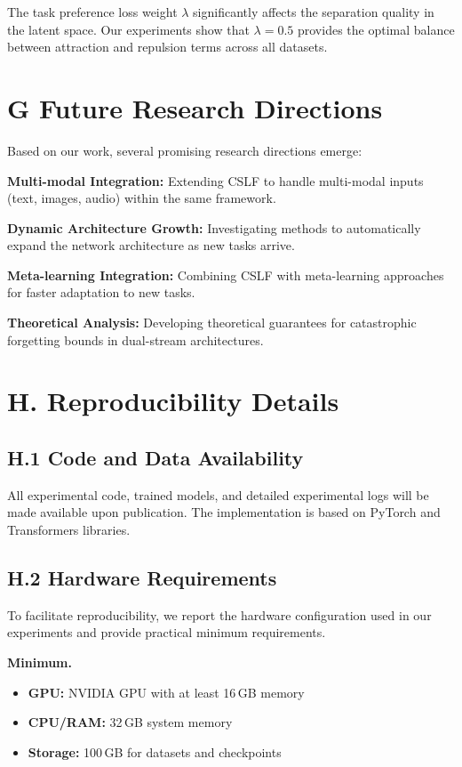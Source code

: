 \documentclass[11pt]{article}
\begin{document}
The task preference loss weight $\lambda$ significantly affects the separation quality in the latent space. Our experiments show that $\lambda = 0.5$ provides the optimal balance between attraction and repulsion terms across all datasets.


\section*{G  Future Research Directions}

Based on our work, several promising research directions emerge:

\textbf{Multi-modal Integration:} Extending CSLF to handle multi-modal inputs (text, images, audio) within the same framework.

\textbf{Dynamic Architecture Growth:} Investigating methods to automatically expand the network architecture as new tasks arrive.

\textbf{Meta-learning Integration:} Combining CSLF with meta-learning approaches for faster adaptation to new tasks.

\textbf{Theoretical Analysis:} Developing theoretical guarantees for catastrophic forgetting bounds in dual-stream architectures.

\section*{H. Reproducibility Details}

\subsection*{H.1 Code and Data Availability}

All experimental code, trained models, and detailed experimental logs will be made available upon publication. The implementation is based on PyTorch and Transformers libraries.

\subsection*{H.2 Hardware Requirements}

To facilitate reproducibility, we report the hardware configuration used in our experiments and provide practical minimum requirements.

\textbf{Minimum.}
\begin{itemize}
    \item \textbf{GPU:} NVIDIA GPU with at least 16\,GB memory
    \item \textbf{CPU/RAM:} 32\,GB system memory
    \item \textbf{Storage:} 100\,GB for datasets and checkpoints
\end{itemize}
\end{document}
